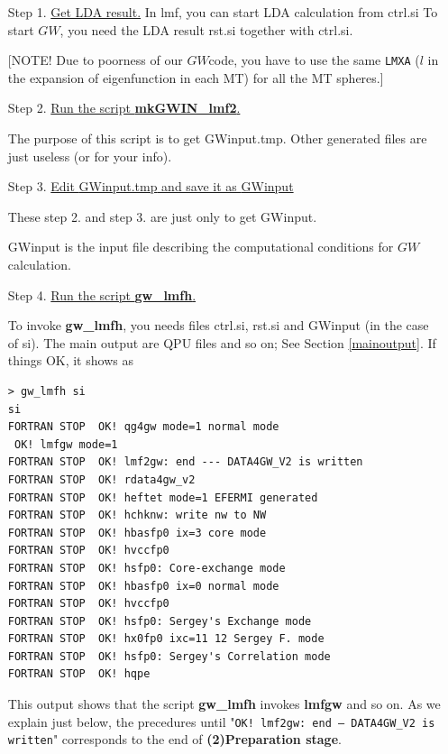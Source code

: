 \documentclass[a4paper,10pt,epsf,fleqn]{article}
\newcommand{\GW}{$GW$}
\newcommand{\exe}[1]{{\bf #1}}
\newcommand{\io}[1]{{\sf  #1}}
\begin{document}
\vspace{3mm}

\begin{enumerate}
%

\item[Step 1.]
\underline{\large Get LDA result.}
In lmf, you can start LDA calculation from \io{ctrl.si}
To start \GW, you need the LDA result \io{rst.si} together with \io{ctrl.si}.

[NOTE! Due to poorness of our \GW code, you have to use 
the same \verb#LMXA# ($l$ in the expansion of eigenfunction 
in each MT) for all the MT spheres.]

\item[Step 2.]
\underline{\large Run the script \exe{mkGWIN\_lmf2}.}

The purpose of this script is to get \io{GWinput.tmp}.
Other generated files are just useless (or for your info).

\item[Step 3.]
\underline{\large Edit \io{GWinput.tmp} and save it as \io{GWinput}}

These step 2. and step 3. are just only to get \io{GWinput}.

\io{GWinput} is the input file describing the computational 
conditions for \GW calculation. 


\item[Step 4.]
\underline{\large Run the script \exe{gw\_lmfh}.}

To invoke \exe{gw\_lmfh}, you needs files 
\io{ctrl.si}, \io{rst.si} and \io{GWinput} (in the case of si).
The main output are \io{QPU} files and so on; See Section \ref{mainoutput}.
If things OK, it shows as
\newpage
{\baselineskip=3mm
\begin{verbatim}
> gw_lmfh si
si
FORTRAN STOP  OK! qg4gw mode=1 normal mode
 OK! lmfgw mode=1 
FORTRAN STOP  OK! lmf2gw: end --- DATA4GW_V2 is written 
FORTRAN STOP  OK! rdata4gw_v2
FORTRAN STOP  OK! heftet mode=1 EFERMI generated 
FORTRAN STOP  OK! hchknw: write nw to NW
FORTRAN STOP  OK! hbasfp0 ix=3 core mode 
FORTRAN STOP  OK! hvccfp0 
FORTRAN STOP  OK! hsfp0: Core-exchange mode
FORTRAN STOP  OK! hbasfp0 ix=0 normal mode 
FORTRAN STOP  OK! hvccfp0 
FORTRAN STOP  OK! hsfp0: Sergey's Exchange mode
FORTRAN STOP  OK! hx0fp0 ixc=11 12 Sergey F. mode
FORTRAN STOP  OK! hsfp0: Sergey's Correlation mode
FORTRAN STOP  OK! hqpe 
\end{verbatim}
}
This output shows that the script {\bf gw\_lmfh} invokes {\bf lmfgw} and so on.
As we explain just below, the precedures until
"{\tt OK! lmf2gw: end --- DATA4GW\_V2 is written}" corresponds to the
end of {\bf (2)Preparation stage}.



\end{enumerate}
\end{document}
